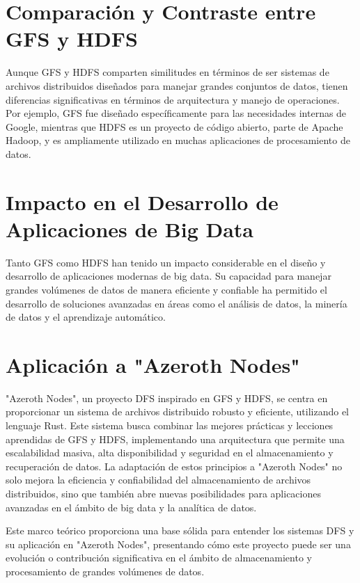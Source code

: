 \section{Comparación y Contraste entre GFS y HDFS}

Aunque GFS y HDFS comparten similitudes en términos de ser sistemas de archivos distribuidos diseñados para manejar grandes conjuntos de datos, tienen diferencias significativas en términos de arquitectura y manejo de operaciones. Por ejemplo, GFS fue diseñado específicamente para las necesidades internas de Google, mientras que HDFS es un proyecto de código abierto, parte de Apache Hadoop, y es ampliamente utilizado en muchas aplicaciones de procesamiento de datos.

\section{Impacto en el Desarrollo de Aplicaciones de Big Data}

Tanto GFS como HDFS han tenido un impacto considerable en el diseño y desarrollo de aplicaciones modernas de big data. Su capacidad para manejar grandes volúmenes de datos de manera eficiente y confiable ha permitido el desarrollo de soluciones avanzadas en áreas como el análisis de datos, la minería de datos y el aprendizaje automático.

\section{Aplicación a "Azeroth Nodes"}

"Azeroth Nodes", un proyecto DFS inspirado en GFS y HDFS, se centra en proporcionar un sistema de archivos distribuido robusto y eficiente, utilizando el lenguaje Rust. Este sistema busca combinar las mejores prácticas y lecciones aprendidas de GFS y HDFS, implementando una arquitectura que permite una escalabilidad masiva, alta disponibilidad y seguridad en el almacenamiento y recuperación de datos. La adaptación de estos principios a "Azeroth Nodes" no solo mejora la eficiencia y confiabilidad del almacenamiento de archivos distribuidos, sino que también abre nuevas posibilidades para aplicaciones avanzadas en el ámbito de big data y la analítica de datos.\newline \hfill \break

Este marco teórico proporciona una base sólida para entender los sistemas DFS y su aplicación en "Azeroth Nodes", presentando cómo este proyecto puede ser una evolución o contribución significativa en el ámbito de almacenamiento y procesamiento de grandes volúmenes de datos.